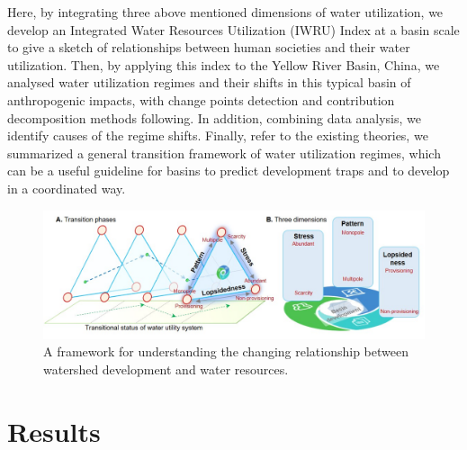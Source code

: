 \documentclass[9pt, twocolumn, twoside, lineno]{pnas-new}
\begin{document}
Here, by integrating three above mentioned dimensions of water utilization, we develop an Integrated Water Resources Utilization (IWRU) Index at a basin scale to give a sketch of relationships between human societies and their water utilization.
Then, by applying this index to the Yellow River Basin, China, we analysed water utilization regimes and their shifts in this typical basin of anthropogenic impacts, with change points detection and contribution decomposition methods following.
In addition, combining data analysis, we identify causes of the regime shifts. 
Finally, refer to the existing theories, we summarized a general transition framework of water utilization regimes, which can be a useful guideline for basins to predict development traps and to develop in a coordinated way.


\begin{figure}%
	\centering
	\includegraphics[width=\linewidth]{../../figures/main/framework.jpg}
	\caption{
		A framework for understanding the changing relationship between watershed development and water resources.
	}
	\label{fig:framework1}
\end{figure}


\section*{Results}
\end{document}
